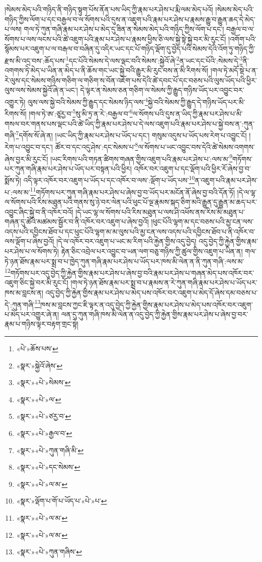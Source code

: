 །སེམས་མེད་པའི་གཉིད་ནི་གཉིད་སྟུག་པོས་ནོན་པས་ཡིད་ཀྱི་རྣམ་པར་ཤེས་པ་རྨི་ལམ་མེད་པའོ། །སེམས་མེད་པའི་གཉིད་ཀྱིས་ལོག་པ་དང་བརྒྱལ་བ་ལ་སོགས་པའི་དུས་ན་འཇུག་པའི་རྣམ་པར་ཤེས་པ་རྣམས་རྒྱུ་བ་རྒྱུན་ཆད་དེ་མེད་པ་ལས། གལ་ཏེ་ཀུན་གཞི་རྣམ་པར་ཤེས་པ་མེད་དུ་ཟིན་ན་སེམས་མེད་པའི་གཉིད་ཀྱིས་ལོག་པ་དང་། བརྒྱལ་བ་ལ་སོགས་པ་ལས་ལངས་པའི་ཚེ་འཇུག་པའི་རྣམ་པར་ཤེས་པ་རྣམས་ཕྱིས་ཅི་ལས་སྐྱེ་སྟེ་སྐྱེ་བར་མི་རུང་ངོ། །འགོག་པའི་སྙོམས་པར་འཇུག་པ་ལ་བརྒལ་བ་བཞིན་དུ་འདིར་ཡང་དང་པོ་གཉིད་ལྡོག་དུ་བྱེད་པའི་སེམས་དེའི་འོག་ཏུ་གཉིད་ཀྱི་རྫས་མི་འདྲ་བས་:ཆོད་པས་\footnote{«པེ་»ཆོས་པས་}དང་པོའི་སེམས་དེ་ལས་ལྡང་བའི་སེམས་:སྐྱེའོ་ཞེ་\footnote{«སྣར་»སྐྱེའོ་ཞེས་}ན་ཡང་དང་པོའི་:སེམས་དེ་\footnote{«སྣར་»«པེ་»སེམས་}ནི་འགགས་ཏེ་མེད་པ་ཡིན་ན་མེད་པ་ནི་ཆོས་གང་ཡང་སྐྱེ་བའི་རྒྱུར་མི་རུང་བས་ན་མི་རིགས་སོ། །གལ་ཏེ་མདོ་སྡེ་པ་ན་རེ་ལུས་དང་སེམས་གཉིས་གཅིག་ལ་གཅིག་ས་བོན་འཇོག་པས་དེའི་ཚེ་དབང་པོ་དང་བཅས་པའི་ལུས་ཡོད་པའི་ཕྱིར་ལུས་ལས་སེམས་སྐྱེའོ་ཞེ་ན་ཡང་། དེ་ལྟར་ན་སེམས་ཅན་གཅིག་ལ་སེམས་ཀྱི་རྒྱུད་གཉིས་ཡོད་པར་འབྱུང་བར་འགྱུར་ཏེ། ལུས་ལས་སྐྱེ་བའི་སེམས་ཀྱི་རྒྱུད་དང་སེམས་ཉིད་ལས་\footnote{«སྣར་»«པེ་»ལ་}སྐྱེ་བའི་སེམས་ཀྱི་རྒྱུད་དེ་གཉིས་ཡོད་པར་མི་རིགས་སོ། །གལ་ཏེ་ཨ་:ཙཱརྱ་བ་\footnote{«སྣར་»«པེ་»ཙརྱ་བ་}སུ་མི་ཏྲ་ན་རེ་:བརྒྱལ་བ་\footnote{«སྣར་»«པེ་»རྒྱལ་བ་}ལ་སོགས་པའི་དུས་ན་ཡིད་ཀྱི་རྣམ་པར་ཤེས་པ་མི་གསལ་བར་གནས་པས་ལྡང་པའི་ཚེ་ཡིད་ཀྱི་རྣམ་པར་ཤེས་པ་དེ་ལས་འཇུག་པའི་རྣམ་པར་ཤེས་པ་སྐྱེ་བས་ན་:ཀུན་གཞི་\footnote{«སྣར་»«པེ་»ཀུན་གཞི་མི་}དགོས་སོ་ཞེ་ན། །ཡང་ཡིད་ཀྱི་རྣམ་པར་ཤེས་པ་ཡོད་པ་དང་། གསུམ་འདུས་པ་ཡོད་པས་རེག་པ་འབྱུང་ངོ། །རེག་པ་འབྱུང་བ་དང་། ཚོར་བ་དང་འདུ་ཤེས་:དང་སེམས་པ་\footnote{«སྣར་»«པེ་»དང་སེམས་}ལ་སོགས་པ་ཡང་འབྱུང་བས་དེའི་ཚེ་སེམས་འགགས་ཞེས་བྱར་མི་རུང་ངོ། །ཡང་རིགས་པའི་གཏན་ཚིགས་གཞན་གྱིས་འཇུག་པའི་རྣམ་པར་ཤེས་པ་:ལས་མ་\footnote{«སྣར་»«པེ་»ལ་མ་}གཏོགས་པར་ཀུན་གཞི་རྣམ་པར་ཤེས་པ་ཡོད་པར་བསྟན་པའི་ཕྱིར། འཁོར་བར་འཇུག་པ་དང་ལྡོག་པའི་ཕྱིར་རོ་ཞེས་བྱ་བ་སྨོས་ཏེ། འདི་ལྟར་འཁོར་བར་འཇུག་པ་ཡོད་པ་དང་འཁོར་བ་ལས་:ལྡོག་པ་ཡོད་པས་\footnote{«སྣར་»ལྡོག་པ་ོག་པ་ཡོད་པ་«པེ་»པ་}ན་འཇུག་པའི་རྣམ་པར་ཤེས་པ་:ལས་མ་\footnote{«སྣར་»«པེ་»ལ་མ་}གཏོགས་པར་ཀུན་གཞི་རྣམ་པར་ཤེས་པ་ཞེས་བྱ་བ་ཡོད་པར་མངོན་ནོ་ཞེས་བྱ་བའི་དོན་ཏོ། །དེ་ལ་ལྷ་ལ་སོགས་པའི་རིས་མཐུན་པའི་གནས་སུ་ཉེ་བར་ལེན་པའི་ཕུང་པོ་ལྔ་རྣམས་སྐད་ཅིག་མའི་རྒྱུན་དུ་རྒྱུན་མ་ཆད་པར་འབྱུང་ཞིང་སྐྱེ་བ་ནི་འཁོར་བའོ། །དེ་ཡང་ལྷ་ལ་སོགས་པའི་རིས་མཐུན་པ་ལས་ཤི་འཕོས་ནས་རིས་མི་མཐུན་པ་གཞན་དུ་ཚེའི་མཚམས་སྦྱོར་བ་ནི་འཁོར་བར་འཇུག་པ་ཞེས་བྱའོ། །ཕུང་པོའི་ལྷག་མ་དང་བཅས་པའི་མྱ་ངན་ལས་འདས་པའི་དབྱིངས་ཐོབ་པ་དང་ཕུང་པོའི་ལྷག་མ་མ་ལུས་པའི་མྱ་ངན་ལས་འདས་པའི་དབྱིངས་ཐོབ་པ་ནི་འཁོར་བ་ལས་ལྡོག་པ་ཞེས་བྱའོ། །དེ་ལ་འཁོར་བར་འཇུག་པ་ཡང་མ་རིག་པའི་རྐྱེན་གྱིས་འདུ་བྱེད། འདུ་བྱེད་ཀྱི་རྐྱེན་གྱིས་རྣམ་པར་ཤེས་པ་ལ་སོགས་ཏེ། རྟེན་ཅིང་འབྲེལ་པར་འབྱུང་བ་ཡན་ལག་བཅུ་གཉིས་ཀྱི་ཚུལ་གྱིས་འཇུག་པ་ཡིན་ན། གལ་ཏེ་ཉན་ཐོས་རྣམ་པར་སྨྲ་བ་པ་ཁྱེད་ཀུན་གཞི་རྣམ་པར་ཤེས་པ་ཡོད་པར་ཁས་མི་ལེན་ན་ནི་ཀུན་གཞི་:ལས་མ་\footnote{«སྣར་»«པེ་»ལ་མ་}གཏོགས་པར་འདུ་བྱེད་ཀྱི་རྐྱེན་གྱིས་རྣམ་པར་ཤེས་པ་ཞེས་བྱ་བའི་རྣམ་པར་ཤེས་པ་གཞན་མེད་པས་འཁོར་བར་འཇུག་ཅིང་སྐྱེ་བར་མི་རུང་ངོ། །གལ་ཏེ་ཉན་ཐོས་རྣམ་པར་སྨྲ་བ་པ་རྣམས་ན་རེ་ཀུན་གཞི་རྣམ་པར་ཤེས་པ་ཡོད་པར་ཁས་མ་བླངས་ན། འདུ་བྱེད་ཀྱི་རྐྱེན་གྱིས་རྣམ་པར་ཤེས་པ་མེད་པས་འཁོར་བར་འཇུག་པ་མེད་དོ་ཞེས་དམ་བཅས་པ་དེ་:ཀུན་གཞི་\footnote{«སྣར་»«པེ་»ཀུན་གཞིས་}ཁས་མ་བླངས་ཀྱང་ཇི་ལྟར་ན་འདུ་བྱེད་ཀྱི་རྐྱེན་གྱིས་རྣམ་པར་ཤེས་པ་མེད་པས་འཁོར་བར་འཇུག་པ་མེད་པར་འགྱུར་ཞེ་ན། ལན་དུ་ཀུན་གཞི་ཁས་མི་ལེན་ན་འདུ་བྱེད་ཀྱི་རྐྱེན་གྱིས་རྣམ་པར་ཤེས་པ་ཞེས་བྱ་བར་རྣམ་པ་གཉིས་ལྟར་བརྟག་གྲང་སྟེ། 